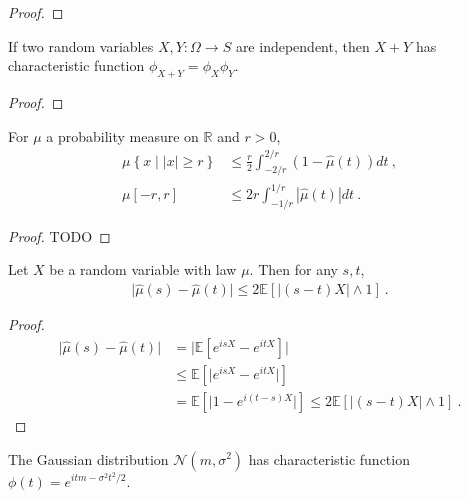\begin{proof}
\end{proof}

\begin{lemma}\label{lem:charFun_add_of_indep}
If two random variables $X, Y : \Omega \to S$ are independent, then $X+Y$ has characteristic function $\phi_{X+Y} = \phi_X \phi_Y$. 
\end{lemma}

\begin{proof}
\end{proof}

\begin{lemma}\label{lem:charFun_bound}
For $\mu$ a probability measure on $\mathbb{R}$ and $r > 0$,
\begin{align*}
\mu \left\{x \mid |x| \ge r\right\}
&\le \frac{r}{2} \int_{-2/r}^{2/r} (1 - \hat{\mu}(t))dt
\: , \\
\mu [-r, r]
&\le 2 r \int_{-1/r}^{1/r} |\hat{\mu}(t)| dt
\: .
\end{align*}
\end{lemma}

\begin{proof}
TODO
\end{proof}

\begin{lemma}\label{lem:abs_sub_charFun}
Let $X$ be a random variable with law $\mu$. Then for any $s, t$,
\begin{align*}
\vert \hat{\mu}(s) - \hat{\mu}(t) \vert
\le 2 \mathbb{E}\left[ \left\vert (s - t) X\right\vert \wedge 1\right]
\: .
\end{align*}
\end{lemma}

\begin{proof}
\begin{align*}
\vert \hat{\mu}(s) - \hat{\mu}(t) \vert
&= \vert \mathbb{E}\left[e^{isX} - e^{itX}\right] \vert
\\
&\le \mathbb{E}\left[\vert e^{isX} - e^{itX} \vert\right]
\\
&= \mathbb{E}\left[\vert 1 - e^{i(t - s)X} \vert\right]
\le 2 \mathbb{E}\left[ \left\vert (s - t) X\right\vert \wedge 1\right]
\: .
\end{align*}
\end{proof}

\begin{lemma}\label{lem:gaussian_charFun}
The Gaussian distribution $\mathcal N(m, \sigma^2)$ has characteristic function $\phi(t) = e^{itm - \sigma^2 t^2 /2}$.
\end{lemma}

